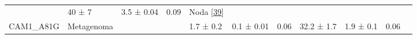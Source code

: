 \documentclass[12pt,twoside]{reedthesis}
\begin{document}
\begin{longtable}[]{@{}lllllllllll@{}}
\begin{minipage}[t]{0.06\columnwidth}
  \end{minipage} & \begin{minipage}[t]{0.05\columnwidth}\raggedright\strut
  40 ± 7\strut
  \end{minipage} & \begin{minipage}[t]{0.05\columnwidth}\raggedright\strut
  3.5 ± 0.04\strut
  \end{minipage} & \begin{minipage}[t]{0.03\columnwidth}\raggedright\strut
  0.09\strut
  \end{minipage} & \begin{minipage}[t]{0.11\columnwidth}\raggedright\strut
  Noda {[}\protect\hyperlink{ref-noda-garcia_insights_2015}{39}{]}\strut
  \end{minipage}\tabularnewline
  \begin{minipage}[t]{0.15\columnwidth}\raggedright\strut
  CAM1\_A81G\strut
  \end{minipage} & \begin{minipage}[t]{0.05\columnwidth}\raggedright\strut
  Metagenoma\strut
  \end{minipage} & \begin{minipage}[t]{0.04\columnwidth}\raggedright\strut
  \strut
  \end{minipage} & \begin{minipage}[t]{0.04\columnwidth}\raggedright\strut
  \strut
  \end{minipage} & \begin{minipage}[t]{0.06\columnwidth}\raggedright\strut
  1.7 ± 0.2\strut
  \end{minipage} & \begin{minipage}[t]{0.06\columnwidth}\raggedright\strut
  0.1 ± 0.01\strut
  \end{minipage} & \begin{minipage}[t]{0.06\columnwidth}\raggedright\strut
  0.06\strut
  \end{minipage} & \begin{minipage}[t]{0.05\columnwidth}\raggedright\strut
  32.2 ± 1.7\strut
  \end{minipage} & \begin{minipage}[t]{0.05\columnwidth}\raggedright\strut
  1.9 ± 0.1\strut
  \end{minipage} & \begin{minipage}[t]{0.03\columnwidth}\raggedright\strut
  0.06\strut
  \end{minipage} & \begin{minipage}[t]{0.11\columnwidth}\raggedright\strut

\end{minipage}
\end{longtable}
\end{document}
